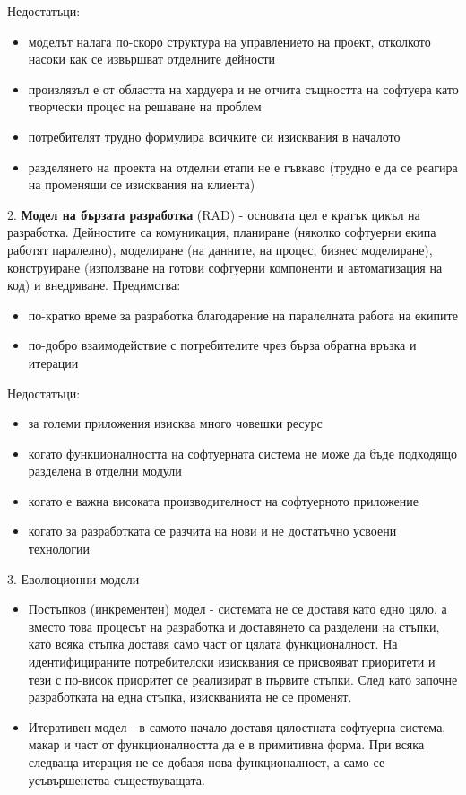 \documentclass{article}
\begin{document}
Недостатъци:
\begin{itemize}
    \item моделът налага по-скоро структура на управлението на проект, отколкото насоки как се извършват отделните дейности
    \item произлязъл е от областта на хардуера и не отчита същността на софтуера като творчески процес на решаване на проблем
    \item потребителят трудно формулира всичките си изисквания в началото
    \item разделянето на проекта на отделни етапи не е гъвкаво (трудно е да се реагира на променящи се изисквания на клиента)
\end{itemize}
2. \textbf{Модел на бързата разработка} (RAD) - основата цел е кратък цикъл на разработка. Дейностите са комуникация, планиране
(няколко софтуерни екипа работят паралелно), моделиране (на данните, на процес, бизнес моделиране), конструиране (използване на
готови софтуерни компоненти и автоматизация на код) и внедряване. \newline\newline
Предимства:
\begin{itemize}
    \item по-кратко време за разработка благодарение на паралелната работа на екипите
    \item  по-добро взаимодействие с потребителите чрез бърза обратна връзка и итерации
\end{itemize}
Недостатъци:
\begin{itemize}
    \item за големи приложения изисква много човешки ресурс
    \item когато функционалността на софтуерната система не може да бъде подходящо разделена в отделни модули
    \item когато е важна високата производителност на софтуерното приложение
    \item когато за разработката се разчита на нови и не достатъчно усвоени технологии
\end{itemize}
3. Еволюционни модели
    \begin{itemize}
        \item Постъпков (инкрементен) модел - системата не се доставя като едно цяло, а вместо това процесът на разработка и
        доставянето са разделени на стъпки, като всяка стъпка доставя само част от цялата функционалност. На идентифицираните
        потребителски изисквания се присвояват приоритети и тези с по-висок приоритет се реализират в първите стъпки. След като
        започне разработката на една стъпка, изискванията не се променят.
        \item Итеративен модел - в самото начало доставя цялостната софтуерна система, макар и част от функционалността да е в
        примитивна форма. При всяка следваща итерация не се добавя нова функционалност, а само се усъвършенства съществуващата.
    \end{itemize}
\end{document}
